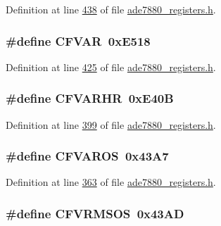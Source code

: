 Definition at line \hyperlink{a00036_source_l00438}{438} of file \hyperlink{a00036_source}{ade7880\-\_\-registers.\-h}.

\hypertarget{a00036_a8edc01effbd3c82649af3c8ad858f1e8}{
\subsubsection[{C\-F\-V\-A\-R}]{\setlength{\rightskip}{0pt plus 5cm}\#define C\-F\-V\-A\-R~0x\-E518}}\label{de/d8c/a00036_a8edc01effbd3c82649af3c8ad858f1e8}


Definition at line \hyperlink{a00036_source_l00425}{425} of file \hyperlink{a00036_source}{ade7880\-\_\-registers.\-h}.

\hypertarget{a00036_ab8f3a80e1dce52d884b5a075014b9b8e}{
\subsubsection[{C\-F\-V\-A\-R\-H\-R}]{\setlength{\rightskip}{0pt plus 5cm}\#define C\-F\-V\-A\-R\-H\-R~0x\-E40\-B}}\label{de/d8c/a00036_ab8f3a80e1dce52d884b5a075014b9b8e}


Definition at line \hyperlink{a00036_source_l00399}{399} of file \hyperlink{a00036_source}{ade7880\-\_\-registers.\-h}.

\hypertarget{a00036_a130c34acd70f4dcf342291a77864e59d}{
\subsubsection[{C\-F\-V\-A\-R\-O\-S}]{\setlength{\rightskip}{0pt plus 5cm}\#define C\-F\-V\-A\-R\-O\-S~0x43\-A7}}\label{de/d8c/a00036_a130c34acd70f4dcf342291a77864e59d}


Definition at line \hyperlink{a00036_source_l00363}{363} of file \hyperlink{a00036_source}{ade7880\-\_\-registers.\-h}.

\hypertarget{a00036_a0fff4fa26b5131f743f5e67766c126ba}{
\subsubsection[{C\-F\-V\-R\-M\-S\-O\-S}]{\setlength{\rightskip}{0pt plus 5cm}\#define C\-F\-V\-R\-M\-S\-O\-S~0x43\-A\-D}}\label{de/d8c/a00036_a0fff4fa26b5131f743f5e67766c126ba}


